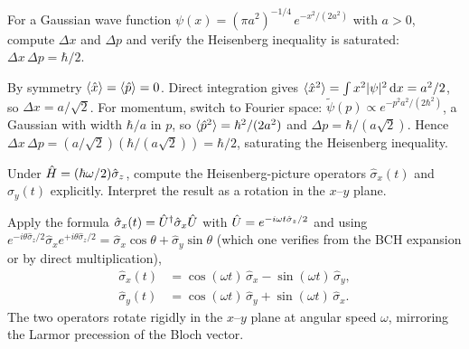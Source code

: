 \begin{exercise}
For a Gaussian wave function
$\psi(x)=(\pi a^2)^{-1/4}\,e^{-x^2/(2a^2)}$ with $a>0$, compute
$\Delta x$ and $\Delta p$ and verify the Heisenberg inequality is
saturated: $\Delta x\,\Delta p=\hbar/2$.
\begin{solution}
By symmetry $\langle\hat{x}\rangle=\langle\hat{p}\rangle=0$.
Direct integration gives
$\langle\hat{x}^2\rangle=\int x^2|\psi|^2\,\dd x=a^2/2$, so
$\Delta x=a/\sqrt 2$. For momentum, switch to Fourier space:
$\tilde\psi(p)\propto e^{-p^2 a^2/(2\hbar^2)}$, a Gaussian with
width $\hbar/a$ in $p$, so
$\langle\hat{p}^2\rangle=\hbar^2/(2a^2)$ and
$\Delta p=\hbar/(a\sqrt 2)$. Hence
$\Delta x\,\Delta p=(a/\sqrt 2)(\hbar/(a\sqrt 2))=\hbar/2$,
saturating the Heisenberg inequality.
\end{solution}
\end{exercise}

\begin{exercise}
Under $\hat{H}=(\hbar\omega/2)\hat\sigma_z$, compute the
Heisenberg-picture operators
$\hat\sigma_x(t)$ and $\hat\sigma_y(t)$ explicitly. Interpret the
result as a rotation in the $x$--$y$ plane.
\begin{solution}
Apply the formula
$\hat\sigma_x(t)=\hat{U}^\dagger\hat\sigma_x\hat{U}$ with
$\hat{U}=e^{-i\omega t\hat\sigma_z/2}$ and using
$e^{-i\theta\hat\sigma_z/2}\hat\sigma_x e^{+i\theta\hat\sigma_z/2}
=\hat\sigma_x\cos\theta+\hat\sigma_y\sin\theta$ (which one verifies
from the BCH expansion or by direct multiplication),
\begin{align*}
\hat\sigma_x(t) &= \cos(\omega t)\,\hat\sigma_x - \sin(\omega t)\,\hat\sigma_y, \\
\hat\sigma_y(t) &= \cos(\omega t)\,\hat\sigma_y + \sin(\omega t)\,\hat\sigma_x.
\end{align*}
The two operators rotate rigidly in the $x$--$y$ plane at angular
speed $\omega$, mirroring the Larmor precession of the Bloch vector.
\end{solution}
\end{exercise}


